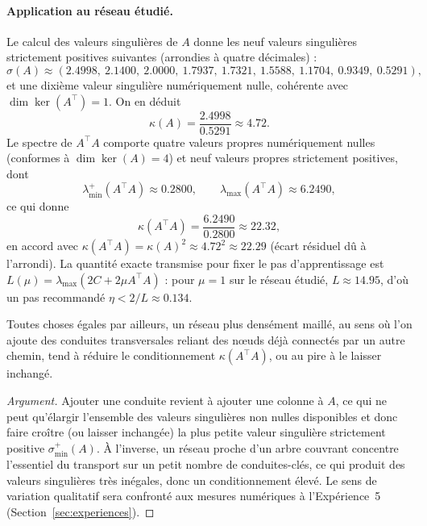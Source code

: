 \documentclass[11pt]{ama-article}
\begin{document}
\paragraph{Application au réseau étudié.} Le calcul des valeurs singulières de $A$ donne les
neuf valeurs singulières strictement positives suivantes (arrondies à quatre décimales) :
\begin{equation}
\sigma(A) \approx (2.4998,\ 2.1400,\ 2.0000,\ 1.7937,\ 1.7321,\ 1.5588,\ 1.1704,\ 0.9349,\ 0.5291),
\end{equation}
et une dixième valeur singulière numériquement nulle, cohérente avec $\dim\ker(A^\top)=1$. On
en déduit
\begin{equation}
\kappa(A) = \frac{2.4998}{0.5291} \approx 4.72.
\end{equation}
Le spectre de $A^\top A$ comporte quatre valeurs propres numériquement nulles (conformes à
$\dim\ker(A)=4$) et neuf valeurs propres strictement positives, dont
\begin{equation}
\lambda_{\min}^{+}(A^\top A) \approx 0.2800, \qquad \lambda_{\max}(A^\top A) \approx 6.2490,
\end{equation}
ce qui donne
\begin{equation}
\kappa(A^\top A) = \frac{6.2490}{0.2800} \approx 22.32,
\end{equation}
en accord avec $\kappa(A^\top A)=\kappa(A)^2\approx 4.72^2\approx 22.29$ (écart résiduel dû à
l'arrondi). La quantité exacte transmise pour fixer le pas d'apprentissage est
$L(\mu)=\lambda_{\max}(2C+2\mu A^\top A)$ : pour $\mu=1$ sur le réseau étudié, $L\approx 14.95$,
d'où un pas recommandé $\eta < 2/L \approx 0.134$.

\begin{proposition}
Toutes choses égales par ailleurs, un réseau plus densément maillé, au sens où l'on ajoute
des conduites transversales reliant des nœuds déjà connectés par un autre chemin, tend à
réduire le conditionnement $\kappa(A^\top A)$, ou au pire à le laisser inchangé.
\end{proposition}

\begin{proof}[Argument]
Ajouter une conduite revient à ajouter une colonne à $A$, ce qui ne peut qu'élargir l'ensemble
des valeurs singulières non nulles disponibles et donc faire croître (ou laisser inchangée) la
plus petite valeur singulière strictement positive $\sigma_{\min}^{+}(A)$. À l'inverse, un
réseau proche d'un arbre couvrant concentre l'essentiel du transport sur un petit nombre de
conduites-clés, ce qui produit des valeurs singulières très inégales, donc un conditionnement
élevé. Le sens de variation qualitatif sera confronté aux mesures numériques à
l'Expérience~5 (Section~\ref{sec:experiences}).
\end{proof}
\end{document}
